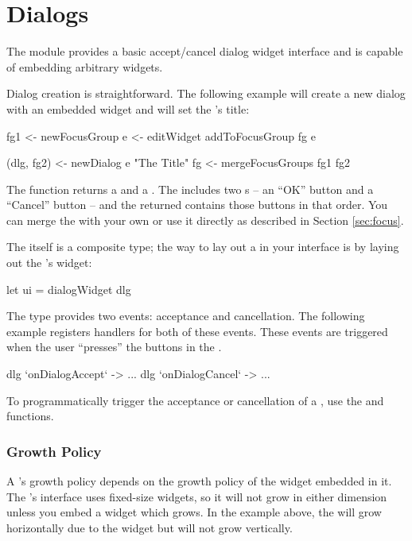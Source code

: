 \section{Dialogs}
\label{sec:dialogs}

The  module provides a basic accept/cancel dialog widget
interface and is capable of embedding arbitrary widgets.

Dialog creation is straightforward.  The following example will create
a new dialog with an embedded  widget and will set the
's title:

\begin{haskellcode}
 fg1 <- newFocusGroup
 e <- editWidget
 addToFocusGroup fg e

 (dlg, fg2) <- newDialog e "The Title"
 fg <- mergeFocusGroups fg1 fg2
\end{haskellcode}

The  function returns a  and a
.  The  includes two s -- an
``OK'' button and a ``Cancel'' button -- and the returned
 contains those buttons in that order.  You can merge
the  with your own or use it directly as described in
Section \ref{sec:focus}.

The  itself is a composite type; the way to lay out a
 in your interface is by laying out the 's
widget:

\begin{haskellcode}
 let ui = dialogWidget dlg
\end{haskellcode}

The  type provides two events: acceptance and cancellation.
The following example registers handlers for both of these events.
These events are triggered when the user ``presses'' the buttons in
the .

\begin{haskellcode}
 dlg `onDialogAccept` \this ->
   ...
 dlg `onDialogCancel` \this ->
   ...
\end{haskellcode}

To programmatically trigger the acceptance or cancellation of a
, use the  and 
functions.

\subsubsection{Growth Policy}

A 's growth policy depends on the growth policy of the
widget embedded in it.  The 's interface uses fixed-size
widgets, so it will not grow in either dimension unless you embed a
widget which grows.  In the example above, the  will grow
horizontally due to the  widget but will not grow vertically.
